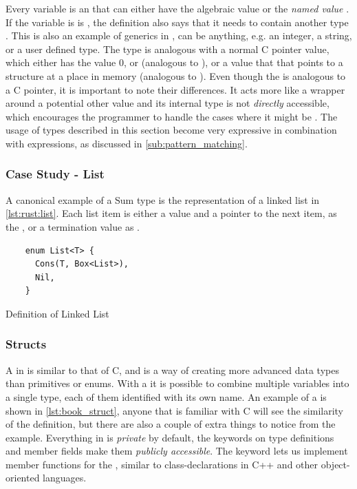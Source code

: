 Every  variable is an {\enum} that can either have the algebraic value  or the \emph{named value} .
If the variable is is , the definition also says that it needs to contain another type .
This is also an example of generics in {\rust},  can be anything, e.g. an integer, a string, or a user defined type.
The  type is analogous with a normal C pointer value, which either has the value 0, or  (analogous to ), or a value that that points to a structure at a place in memory (analogous to ).
Even though the  is analogous to a C pointer, it is important to note their differences.
It acts more like a wrapper around a potential other value and its internal type is not \emph{directly} accessible, which encourages the programmer to handle the cases where it might be .
The usage of {\enum} types described in this section become very expressive in combination with  expressions, as discussed in \autoref{sub:pattern_matching}.

\subsubsection{Case Study - List}

A canonical example of a Sum type is the representation of a linked list in \autoref{lst:rust:list}.
Each list item is either a value and a pointer to the next item, as the , or a termination value as .

\begin{listing}[H]
  \begin{verbatim}
    enum List<T> {
      Cons(T, Box<List>),
      Nil,
    }
  \end{verbatim}
  \caption{Definition of Linked List}
  \label{lst:rust:list}
\end{listing}

\subsubsection{Structs}
\label{ssub:structs}

A  in {\rust} is similar to that of C, and is a way of creating more advanced data types than primitives or enums.
With a  it is possible to combine multiple variables into a single type, each of them identified with its own name.
An example of a  is shown in \autoref{lst:book_struct}, anyone that is familiar with C will see the similarity of the  definition, but there are also a couple of extra things to notice from the example.
Everything in {\rust} is \emph{private} by default, the  keywords on type definitions and member fields make them \emph{publicly accessible}.
The  keyword lets us implement member functions for the , similar to class-declarations in C++ and other object-oriented languages.

